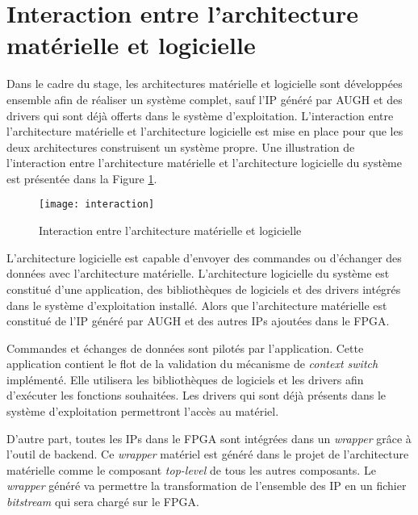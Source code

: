 \section{Interaction entre l'architecture matérielle et logicielle}

Dans le cadre du stage, les architectures matérielle et logicielle sont
développées ensemble afin de réaliser un système complet,
sauf l'IP généré par AUGH et des drivers qui sont déjà offerts dans
le système d'exploitation.
L'interaction entre l'architecture matérielle et l'architecture logicielle est mise en place
pour que les deux architectures construisent un système propre.
Une illustration de l'interaction entre l'architecture matérielle 
et l'architecture logicielle du système est présentée dans la Figure \ref{fig:interaction}.

\begin{figure}[h]
	\centering
	\texttt{[image: interaction]}
	\caption{Interaction entre l'architecture matérielle et logicielle}
	\label{fig:interaction}
	\vspace{-2mm}
\end{figure}

L'architecture logicielle est capable d'envoyer des commandes ou
d'échanger des données avec l'architecture matérielle.
L'architecture logicielle du système est constitué d'une application, des bibliothèques de logiciels et des drivers
intégrés dans le système d'exploitation installé. Alors que l'architecture matérielle
est constitué de l'IP généré par AUGH et des autres IPs ajoutées dans le FPGA.

Commandes et échanges de données sont pilotés par l'application. Cette application
contient le flot de la validation du mécanisme de \emph{context switch} implémenté.
Elle utilisera les bibliothèques de logiciels et les drivers afin d'exécuter les fonctions souhaitées.
Les drivers qui sont déjà présents dans le système d'exploitation permettront l'accès au
matériel.

D'autre part, toutes les IPs dans le FPGA sont intégrées dans un \emph{wrapper} grâce
à l'outil de backend. Ce \emph{wrapper} matériel est généré dans le projet de l'architecture matérielle
comme le composant \emph{top-level} de tous les autres composants.
Le \emph{wrapper} généré va permettre la transformation de l'ensemble des IP en un fichier \emph{bitstream} qui sera
chargé sur le FPGA.